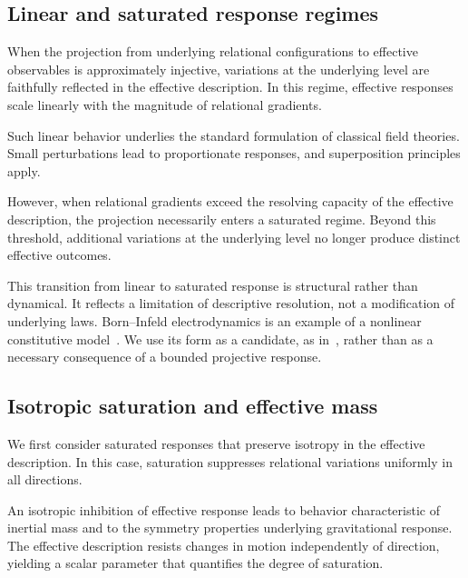 \documentclass[pdflatex,sn-mathphys-num]{sn-jnl} %
\theoremstyle{remark}
\begin{document}
    \subsection{Linear and saturated response regimes}
      \label{subsec:linear-saturated}

      When the projection from underlying relational configurations to effective
      observables is approximately injective, variations at the underlying level are
      faithfully reflected in the effective description.
      In this regime, effective responses scale linearly with the magnitude of
      relational gradients.

      Such linear behavior underlies the standard formulation of classical field
      theories.
      Small perturbations lead to proportionate responses, and superposition
      principles apply.

      However, when relational gradients exceed the resolving capacity of the
      effective description, the projection necessarily enters a saturated regime.
      Beyond this threshold, additional variations at the underlying level no longer
      produce distinct effective outcomes.

      This transition from linear to saturated response is structural rather than
      dynamical.
      It reflects a limitation of descriptive resolution, not a modification of
      underlying laws.
      Born--Infeld electrodynamics is an example of a nonlinear constitutive model~\cite{BornInfeld1934}.
      We use its form as a candidate, as in~\cite{Beau2026c}, rather than as a necessary consequence
      of a bounded projective response.

    \subsection{Isotropic saturation and effective mass}
      \label{subsec:isotropic}

      We first consider saturated responses that preserve isotropy in the effective
      description.
      In this case, saturation suppresses relational variations uniformly in all
      directions.

      An isotropic inhibition of effective response leads to behavior
      characteristic of inertial mass and to the symmetry properties underlying
      gravitational response.
      The effective description resists changes in motion independently of direction,
      yielding a scalar parameter that quantifies the degree of saturation.
\end{document}
